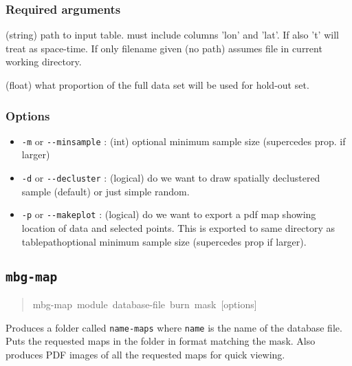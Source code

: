 \subsubsection{Required arguments%
}
\setcounter{listcnt0}{0}
\begin{list}{.}
{
\setlength{\rightmargin}{\leftmargin}
}

\item (string) path to input table. must include columns 'lon' and 'lat'. If
also 't' will treat as space-time. If only filename given (no path) assumes file
in current working directory.

\item (float) what proportion of the full data set will be used for hold-out set.
\end{list}




\subsubsection{Options%
}
%
\begin{itemize}

\item \texttt{-m} or \texttt{-{}-minsample} : (int) optional minimum sample size (supercedes prop.
if larger)

\item \texttt{-d} or \texttt{-{}-decluster} : (logical) do we want to draw spatially declustered
sample (default) or just simple random.

\item \texttt{-p} or \texttt{-{}-makeplot} : (logical) do we want to export a pdf map showing
location of data and selected points. This is exported to same directory as
tablepathoptional minimum sample size (supercedes prop if larger).

\end{itemize}




\subsection{\texttt{mbg-map}%
}
%
\begin{quote}{\ttfamily \raggedright \noindent
mbg-map~module~database-file~burn~mask~{[}options{]}
}
\end{quote}

Produces a folder called \texttt{name-maps} where \texttt{name} is the name of the database file.
Puts the requested maps in the folder in format matching the mask. Also produces PDF
images of all the requested maps for quick viewing.




